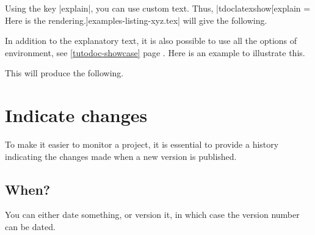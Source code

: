 

\begin{tdocexa}
    Using the key \tdocinlatex|explain|, you can use custom text. Thus, \tdocinlatex|tdoclatexshow[explain = Here is the rendering.]{examples-listing-xyz.tex}| will give the following.

    \medskip

    \begin{tdocshowcaseDOC}

    \end{tdocshowcaseDOC}
\end{tdocexa}




\begin{tdocexa}
    In addition to the explanatory text, it is also possible to use all the options of  environment, see \ref{tutodoc-showcase} page \pageref{tutodoc-showcase}.
    Here is an example to illustrate this.

    \medskip



    \medskip

    This will produce the following.

    \medskip

    \begin{tdocshowcaseDOC}
        

    \end{tdocshowcaseDOC}
\end{tdocexa}


\section{Indicate changes}
\label{tutodoc-changes}

To make it easier to monitor a project, it is essential to provide a history indicating the changes made when a new version is published.



\subsection{When?}
\label{tutodoc-changes-when}

You can either date something, or version it, in which case the version number can be dated.


